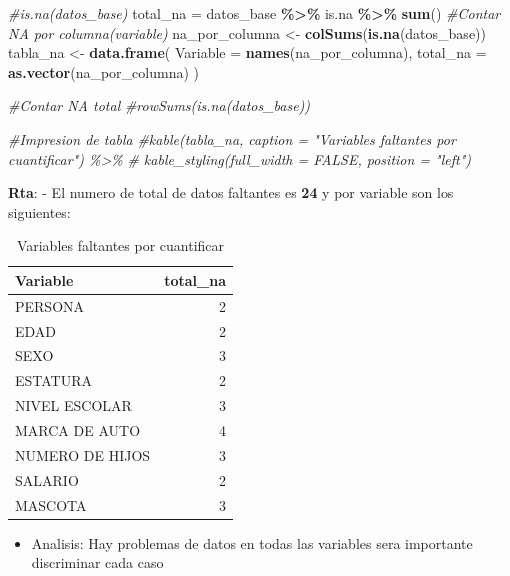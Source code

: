 \documentclass[
]{article}
\newenvironment{Shaded}{\begin{snugshade}}{\end{snugshade}}
\newcommand{\AttributeTok}[1]{\textcolor[rgb]{0.13,0.29,0.53}{#1}}
\newcommand{\CommentTok}[1]{\textcolor[rgb]{0.56,0.35,0.01}{\textit{#1}}}
\newcommand{\FunctionTok}[1]{\textcolor[rgb]{0.13,0.29,0.53}{\textbf{#1}}}
\newcommand{\NormalTok}[1]{#1}
\newcommand{\OtherTok}[1]{\textcolor[rgb]{0.56,0.35,0.01}{#1}}
\newcommand{\SpecialCharTok}[1]{\textcolor[rgb]{0.81,0.36,0.00}{\textbf{#1}}}
\providecommand{\tightlist}{%
  \setlength{\itemsep}{0pt}\setlength{\parskip}{0pt}}
\begin{document}
\begin{Shaded}
\begin{Highlighting}[]
\CommentTok{\#is.na(datos\_base)}
\NormalTok{total\_na }\OtherTok{=}\NormalTok{ datos\_base }\SpecialCharTok{\%\textgreater{}\%}\NormalTok{ is.na }\SpecialCharTok{\%\textgreater{}\%} \FunctionTok{sum}\NormalTok{()  }
\CommentTok{\#Contar NA por columna(variable) }
\NormalTok{na\_por\_columna }\OtherTok{\textless{}{-}} \FunctionTok{colSums}\NormalTok{(}\FunctionTok{is.na}\NormalTok{(datos\_base))}
\NormalTok{tabla\_na }\OtherTok{\textless{}{-}} \FunctionTok{data.frame}\NormalTok{(}
   \AttributeTok{Variable =} \FunctionTok{names}\NormalTok{(na\_por\_columna), }
   \AttributeTok{total\_na =} \FunctionTok{as.vector}\NormalTok{(na\_por\_columna) }
\NormalTok{)}

\CommentTok{\#Contar NA total }
\CommentTok{\#rowSums(is.na(datos\_base))}

\CommentTok{\#Impresion de tabla }
\CommentTok{\#kable(tabla\_na, caption = "Variables faltantes por cuantificar")  \%\textgreater{}\%}
\CommentTok{\#  kable\_styling(full\_width = FALSE, position = "left")}
\end{Highlighting}
\end{Shaded}

\textbf{Rta}: - El numero de total de datos faltantes es \textbf{24} y
por variable son los siguientes:

\begin{longtable}[l]{lr}
\caption{\label{tab:tabla_variables_na}Variables faltantes por cuantificar}\\
\toprule
Variable & total\_na\\
\midrule
PERSONA & 2\\
EDAD & 2\\
SEXO & 3\\
ESTATURA & 2\\
NIVEL ESCOLAR & 3\\
\addlinespace
MARCA DE AUTO & 4\\
NUMERO DE HIJOS & 3\\
SALARIO & 2\\
MASCOTA & 3\\
\bottomrule
\end{longtable}

\begin{itemize}
\tightlist
\item
  Analisis: Hay problemas de datos en todas las variables sera
  importante discriminar cada caso
\end{itemize}
\end{document}
